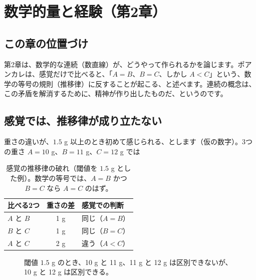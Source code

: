 \documentclass[a4paper,11pt,openany]{ltjsbook}
\begin{document}
\chapter{数学的量と経験（第2章）}

\section{この章の位置づけ}

第2章は、数学的な連続（数直線）が、どうやって作られるかを論じます。ポアンカレは、感覚だけで比べると、「$A=B$、$B=C$、しかし $A<C$」という、数学の等号の規則（推移律）に反することが起こる、と述べます。連続の概念は、この矛盾を解消するために、精神が作り出したものだ、というのです。

\section{感覚では、推移律が成り立たない}

重さの違いが、$1.5$ g 以上のとき初めて感じられる、とします（仮の数字）。3つの重さ $A=10$ g、$B=11$ g、$C=12$ g では

\begin{table}[htbp]
\centering
\begin{tabular}{lcl}
\toprule
比べる2つ & 重さの差 & 感覚での判断\\
\midrule
$A$ と $B$ & 1 g & 同じ（$A=B$）\\
$B$ と $C$ & 1 g & 同じ（$B=C$）\\
$A$ と $C$ & 2 g & 違う（$A<C$）\\
\bottomrule
\end{tabular}
\caption{感覚の推移律の破れ（閾値を $1.5$ g とした例）。数学の等号では、$A=B$ かつ $B=C$ なら $A=C$ のはず。}
\end{table}

\begin{figure}[htbp]
\centering
{}
\caption{閾値 $1.5$ g のとき、10 g と 11 g、11 g と 12 g は区別できないが、10 g と 12 g は区別できる。}
\end{figure}
\end{document}
